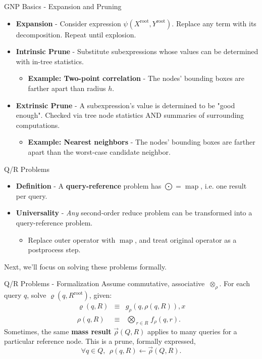 \documentclass[pdf,colorBG,slideColor]{prosper}
\newcommand{\itemt}[1]{\item {\bf #1} -}
\DeclareMathOperator*{\map}{map}
\newcommand{\gnp}{\psi}
\newcommand{\defterm}[1]{{\bf #1}}
\newcommand{\kdroot}[1]{#1^{\text{root}}}
\newcommand{\nameOp}[2]{\mathop{#1\nolimits\!\!_{#2}}}
\newcommand{\nameop}[2]{{\scriptstyle\:}#1_{\!#2}}
\newcommand{\myOp}[1]{\nameOp{\bigotimes}{#1}}
\newcommand{\myop}[1]{\nameop{\otimes}{#1}}
\newcommand{\letterqr}{\rho}
\newcommand{\outqr}{\varrho}
\newcommand{\inqr}{\rho}
\newcommand{\Opqr}{\myOp{\letterqr}}
\newcommand{\opqr}{\myop{\letterqr}}
\newcommand{\fqr}{f_{\!\letterqr}}
\newcommand{\gqr}{g_{\!\letterqr}}
\newcommand{\inqrv}{\vec{\rho}}
\begin{document}
\begin{slide}{GNP Basics - Expansion and Pruning}
  \begin{itemize}
    \itemt{Expansion}
    Consider expression $\gnp(\kdroot{X}, \kdroot{Y})$.
    Replace any term with its decomposition.
    Repeat until explosion.
    \itemt{Intrinsic Prune}
    Substitute subexpressions whose values can be determined with
    in-tree statistics.
    \begin{itemize}
      \itemt{Example: Two-point correlation} The nodes' bounding boxes are
      farther apart than radius $h$.
    \end{itemize}
    \itemt{Extrinsic Prune}
    A subexpression's value is determined to be "good enough".
    Checked via tree node statistics AND summaries of surrounding computations.
    \begin{itemize}
      \itemt{Example: Nearest neighbors}
      The nodes' bounding boxes are farther apart than the
      worst-case candidate neighbor.
    \end{itemize}
  \end{itemize}
\end{slide}

\begin{slide}{Q/R Problems}
  \begin{itemize}
    \itemt{Definition} A \defterm{query-reference} problem has $\bigodot = \map$, i.e. one result per query.
    \itemt{Universality} {\it Any} second-order reduce problem can be transformed into a query-reference problem.
    \begin{itemize} \item
      Replace outer operator with $\map$, and treat original operator as a postprocess step.
    \end{itemize}
  \end{itemize}
  Next, we'll focus on solving these problems formally.
\end{slide}

\begin{slide}{Q/R Problems - Formalization}
  Assume commutative, associative $\opqr$.
  For each query $q$, solve $\outqr(q, \kdroot{R})$, given:
  \begin{eqnarray*}
    \outqr(q, R) &\equiv& \gqr(q, \inqr(q, R)),
x    \\
    \inqr(q, R) &\equiv& \Opqr_{r \in R} \fqr(q, r).
  \end{eqnarray*}
  Sometimes, the same \defterm{mass result} $\inqrv(Q, R)$
  applies to many queries for a particular reference node.
  This is a prune, formally expressed,
  \[
  \forall q \in Q,~~ \inqr(q, R) \gets \inqrv(Q, R).
  \]
\end{slide}
\end{document}
